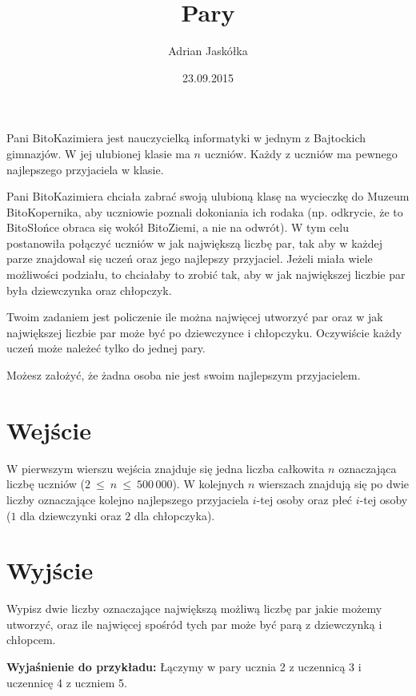 \documentclass[zad,zawodnik,utf8]{sinol}
\title{Pary}
\date{23.09.2015}
\author{Adrian Jaskółka}
\begin{document}
  \begin{tasktext}%
Pani BitoKazimiera jest nauczycielką informatyki w jednym z Bajtockich gimnazjów. W jej ulubionej klasie ma $n$ uczniów. Każdy z uczniów ma pewnego najlepszego przyjaciela w klasie.

	Pani BitoKazimiera chciała zabrać swoją ulubioną klasę na wycieczkę do Muzeum BitoKopernika, aby uczniowie poznali dokoniania ich rodaka 
	(np. odkrycie, że to BitoSłońce obraca się wokół BitoZiemi, a nie na odwrót). W tym celu postanowiła połączyć uczniów w jak największą liczbę par, 
	tak aby w każdej parze znajdował się uczeń oraz jego najlepszy przyjaciel. Jeżeli miała wiele możliwości podziału, to chciałaby to zrobić tak,
    aby w jak największej liczbie par była dziewczynka oraz chłopczyk.

	Twoim zadaniem jest policzenie ile można najwięcej utworzyć par oraz w jak największej liczbie par może być po dziewczynce i chłopczyku.
	Oczywiście każdy uczeń może należeć tylko do jednej pary.
	
	Możesz założyć, że żadna osoba nie jest swoim najlepszym przyjacielem.

  \section{Wejście}
  	
	W pierwszym wierszu wejścia znajduje się jedna liczba całkowita $n$ oznaczająca liczbę uczniów ($2~\leq~n~\leq~500\,000$). W kolejnych $n$ wierszach znajdują się po dwie liczby oznaczające kolejno
	najlepszego przyjaciela $i$-tej osoby oraz płeć $i$-tej osoby ($1$ dla dziewczynki oraz $2$ dla chłopczyka).

  \section{Wyjście}
  	
	Wypisz dwie liczby oznaczające największą możliwą liczbę par jakie możemy utworzyć, oraz ile najwięcej spośród tych par może być parą z dziewczynką i chłopcem.

  \makecompactexample

\medskip
\noindent
\textbf{Wyjaśnienie do przykładu:}
Łączymy w pary ucznia 2 z uczennicą 3 i uczennicę 4 z uczniem 5.

  \end{tasktext}
\end{document}
